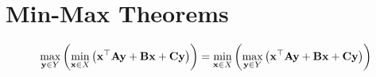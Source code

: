 \section{Min-Max Theorems}
\begin{equation}
\max_{\mathbf y\in Y}\left( \min_{\mathbf x \in X}	\left( \mathbf{x}^\top\mathbf{A}\mathbf{y}+\mathbf{B}\mathbf{x} +\mathbf{C}\mathbf{y} \right) \right) =\min_{\mathbf x\in X}\left( \max_{\mathbf y \in Y}	\left( \mathbf{x}^\top\mathbf{A}\mathbf{y}+\mathbf{B}\mathbf{x} +\mathbf{C}\mathbf{y} \right) \right)
\end{equation}

